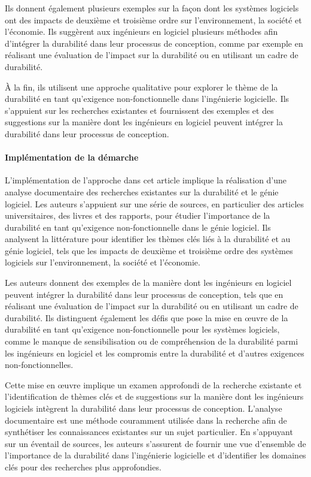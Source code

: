 Ils donnent également plusieurs exemples sur la façon dont les systèmes logiciels ont des impacts de deuxième et troisième ordre sur l'environnement, la société et l'économie. Ils suggèrent aux ingénieurs en logiciel plusieurs méthodes afin d'intégrer la durabilité dans leur processus de conception, comme par exemple en réalisant une évaluation de l'impact sur la durabilité ou en utilisant un cadre de durabilité. 

À la fin, ils utilisent une approche qualitative pour explorer le thème de la durabilité en tant qu'exigence non-fonctionnelle dans l'ingénierie logicielle. Ils s'appuient sur les recherches existantes et fournissent des exemples et des suggestions sur la manière dont les ingénieurs en logiciel peuvent intégrer la durabilité dans leur processus de conception.

\paragraph{Implémentation de la démarche}
L'implémentation de l'approche dans cet article implique la réalisation d'une analyse documentaire des recherches existantes sur la durabilité et le génie logiciel. Les auteurs s'appuient sur une série de sources, en particulier des articles universitaires, des livres et des rapports, pour étudier l'importance de la durabilité en tant qu'exigence non-fonctionnelle dans le génie logiciel. Ils analysent la littérature pour identifier les thèmes clés liés à la durabilité et au génie logiciel, tels que les impacts de deuxième et troisième ordre des systèmes logiciels sur l'environnement, la société et l'économie.

Les auteurs donnent des exemples de la manière dont les ingénieurs en logiciel peuvent intégrer la durabilité dans leur processus de conception, tels que en réalisant une évaluation de l'impact sur la durabilité ou en utilisant un cadre de durabilité. Ils distinguent également les défis que pose la mise en œuvre de la durabilité en tant qu'exigence non-fonctionnelle pour les systèmes logiciels, comme le manque de sensibilisation ou de compréhension de la durabilité parmi les ingénieurs en logiciel et les compromis entre la durabilité et d'autres exigences non-fonctionnelles.

Cette mise en œuvre implique un examen approfondi de la recherche existante et l'identification de thèmes clés et de suggestions sur la manière dont les ingénieurs logiciels intègrent la durabilité dans leur processus de conception. L'analyse documentaire est une méthode couramment utilisée dans la recherche afin de synthétiser les connaissances existantes sur un sujet particulier. En s'appuyant sur un éventail de sources, les auteurs s'assurent de fournir une vue d'ensemble de l'importance de la durabilité dans l'ingénierie logicielle et d'identifier les domaines clés pour des recherches plus approfondies.

